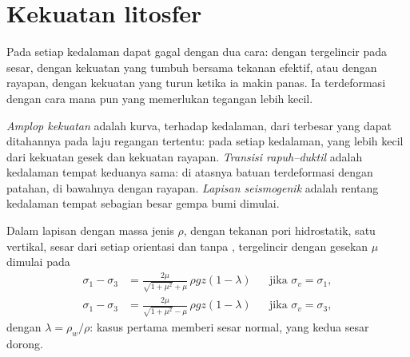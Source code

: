 \section{Kekuatan litosfer}\label{sec:b1:stress-strain-rheology:envelope}

Pada setiap kedalaman  dapat gagal dengan dua cara: dengan tergelincir pada sesar, dengan kekuatan yang tumbuh bersama tekanan efektif, atau dengan rayapan, dengan kekuatan yang turun ketika ia makin panas. Ia terdeformasi dengan cara mana pun yang memerlukan tegangan lebih kecil.

\begin{definition}\label{def:b1:stress-strain-rheology:strength-envelope}
\emph{Amplop kekuatan}  adalah kurva, terhadap kedalaman, dari  terbesar yang dapat ditahannya pada laju regangan tertentu: pada setiap kedalaman, yang lebih kecil dari kekuatan gesek dan kekuatan rayapan. \emph{Transisi rapuh--duktil} adalah kedalaman tempat keduanya sama: di atasnya batuan terdeformasi dengan patahan, di bawahnya dengan rayapan. \emph{Lapisan seismogenik} adalah rentang kedalaman tempat sebagian besar gempa bumi dimulai.
\end{definition}

\begin{proposition}\label{prop:b1:stress-strain-rheology:brittle-gradient}
Dalam lapisan dengan massa jenis $\rho$, dengan tekanan pori hidrostatik, satu  vertikal, sesar dari setiap orientasi dan tanpa , tergelincir dengan gesekan $\mu$ dimulai pada 
\begin{align*}
  \sigma_1 - \sigma_3 &= \frac{2\mu}{\sqrt{1+\mu^2} + \mu}\,\rho g z(1-\lambda)
  && \text{jika $\sigma_v = \sigma_1$}, \\
  \sigma_1 - \sigma_3 &= \frac{2\mu}{\sqrt{1+\mu^2} - \mu}\,\rho g z(1-\lambda)
  && \text{jika $\sigma_v = \sigma_3$},
\end{align*}
dengan $\lambda = \rho_w/\rho$: kasus pertama memberi sesar normal, yang kedua sesar dorong.
\end{proposition}

